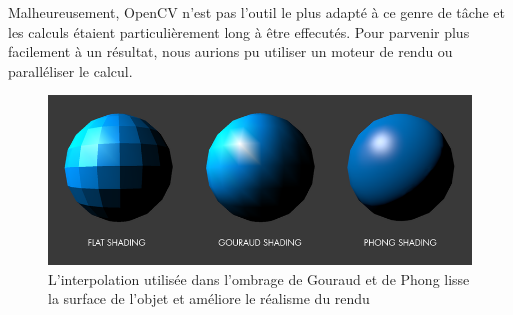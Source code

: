     Malheureusement, OpenCV n'est pas l'outil le plus adapté à ce genre de tâche et les calculs étaient particulièrement long à être effecutés. Pour parvenir plus facilement à un résultat, nous aurions pu utiliser un moteur de rendu ou paralléliser le calcul.

    \begin{figure}[!h]
        \centering
        \includegraphics[scale=0.25]{img/shading.png}
        \caption{L'interpolation utilisée dans l'ombrage de Gouraud et de Phong lisse la surface de l'objet et améliore le réalisme du rendu}
    \end{figure}